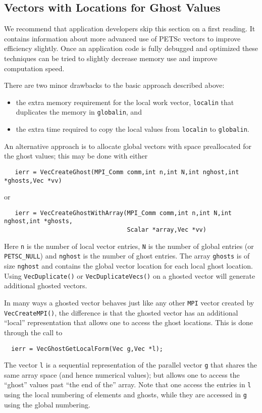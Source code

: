 \subsection{Vectors with Locations for Ghost Values}

We recommend that application developers skip this section on a first reading.
It contains information about more advanced use of PETSc vectors to improve 
efficiency slightly. Once an application code is fully debugged and optimized
these techniques can be tried to slightly decrease memory use and improve 
computation speed.

There are two minor drawbacks to the basic approach described above:
\begin{itemize}
\item the extra memory requirement for the local work vector, {\tt localin} that
      duplicates the memory in {\tt globalin}, and
\item the extra time required to copy the local values from {\tt localin} to 
      {\tt globalin}.
\end{itemize}

An alternative approach is to allocate global vectors with space preallocated for 
the ghost values; this may be done with either 
\begin{verbatim}
   ierr = VecCreateGhost(MPI_Comm comm,int n,int N,int nghost,int *ghosts,Vec *vv)
\end{verbatim}
or
\begin{verbatim}
   ierr = VecCreateGhostWithArray(MPI_Comm comm,int n,int N,int nghost,int *ghosts,
                                  Scalar *array,Vec *vv)
\end{verbatim}
Here   {\tt n} is the 
number of local vector entries, {\tt N} is the number of 
global entries (or {\tt PETSC\_NULL}) and {\tt nghost} is the number of 
ghost entries. The array {\tt ghosts} is of size {\tt nghost} and contains the 
global vector location for each local ghost location. Using {\tt VecDuplicate()}
or {\tt VecDuplicateVecs()} on a ghosted vector will generate additional ghosted vectors.

In many ways a ghosted vector behaves just like any other {\tt MPI} vector created 
by {\tt VecCreateMPI()}, the difference is that the ghosted vector has an additional 
``local'' representation that allows one to access the ghost locations. This is done
through the call to  
\begin{verbatim}
  ierr = VecGhostGetLocalForm(Vec g,Vec *l);
\end{verbatim}
The vector {\tt l} is a 
sequential representation of the parallel vector {\tt g} 
that shares the same array space (and hence numerical values); but allows one to 
access the ``ghost'' values past ``the end of the'' array. Note that one access the 
entries in {\tt l} using the local numbering of elements and ghosts, while they 
are accessed in {\tt g} using the global numbering.

